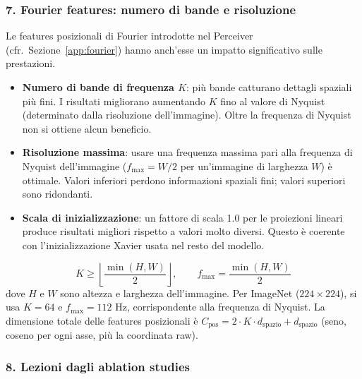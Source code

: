 \documentclass[
  11pt,
]{article}
\begin{document}
\subsubsection*{7. Fourier features: numero di bande e risoluzione}

Le features posizionali di Fourier introdotte nel Perceiver (cfr.\ Sezione~\ref{app:fourier}) hanno anch'esse un impatto significativo sulle prestazioni.

\begin{itemize}
  \item \textbf{Numero di bande di frequenza $K$}: più bande catturano dettagli spaziali più fini. I risultati migliorano aumentando $K$ fino al valore di Nyquist (determinato dalla risoluzione dell'immagine). Oltre la frequenza di Nyquist non si ottiene alcun beneficio.
  \item \textbf{Risoluzione massima}: usare una frequenza massima pari alla frequenza di Nyquist dell'immagine ($f_{\max} = W/2$ per un'immagine di larghezza $W$) è ottimale. Valori inferiori perdono informazioni spaziali fini; valori superiori sono ridondanti.
  \item \textbf{Scala di inizializzazione}: un fattore di scala 1.0 per le proiezioni lineari produce risultati migliori rispetto a valori molto diversi. Questo è coerente con l'inizializzazione Xavier usata nel resto del modello.
\end{itemize}

\begin{formulabox}[title={\textbf{Regola pratica per le Fourier features}}]
\[
K \geq \left\lfloor \frac{\min(H, W)}{2} \right\rfloor, \qquad f_{\max} = \frac{\min(H, W)}{2}
\]
dove $H$ e $W$ sono altezza e larghezza dell'immagine. Per ImageNet ($224 \times 224$), si usa $K = 64$ e $f_{\max} = 112$ Hz, corrispondente alla frequenza di Nyquist. La dimensione totale delle features posizionali è $C_{\text{pos}} = 2 \cdot K \cdot d_{\text{spazio}} + d_{\text{spazio}}$ (seno, coseno per ogni asse, più la coordinata raw).
\end{formulabox}

\subsubsection*{8. Lezioni dagli ablation studies}
\end{document}
